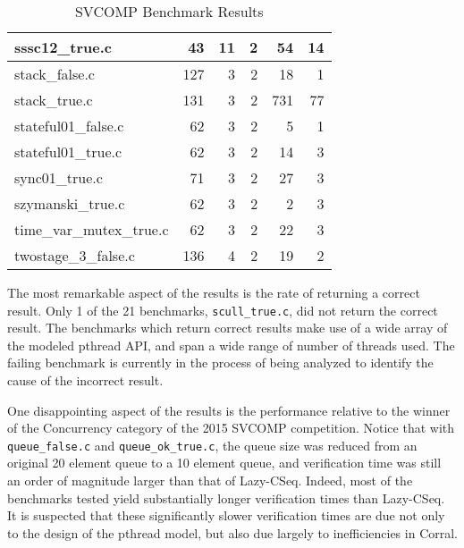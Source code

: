 \begin{table}[ht]
\begin{tabular}{|l|r|r|r|r|r|}
\hline
sssc12\_true.c             & 43  & 11      & 2            & 54            & 14           \\
\hline
stack\_false.c             & 127 & 3       & 2            & 18            & 1            \\
\hline
stack\_true.c              & 131 & 3       & 2            & 731           & 77           \\
\hline
stateful01\_false.c        & 62  & 3       & 2            & 5             & 1            \\
\hline
stateful01\_true.c         & 62  & 3       & 2            & 14            & 3            \\
\hline
sync01\_true.c             & 71  & 3       & 2            & 27            & 3            \\
\hline
szymanski\_true.c          & 62  & 3       & 2            & 2             & 3            \\
\hline
time\_var\_mutex\_true.c   & 62  & 3       & 2            & 22            & 3            \\
\hline
twostage\_3\_false.c       & 136 & 4       & 2            & 19            & 2            \\
\hline
\end{tabular}
\caption{SVCOMP Benchmark Results}\label{table:benchmarkresults}
\end{table}

The most remarkable aspect of the results is the rate of returning a
correct result. Only 1 of the 21 benchmarks,
\lstinline[identifierstyle=\color{black}]|scull_true.c|, did not
return the correct result.  The benchmarks which return correct
results make use of a wide array of the modeled pthread API, and span
a wide range of number of threads used.   The failing benchmark is
currently in the process of being analyzed to identify the cause of
the incorrect result.

One disappointing aspect of the results is the performance relative to
the winner of the Concurrency category of the 2015 SVCOMP
competition.  Notice that with
\lstinline[identifierstyle=\color{black}]|queue_false.c| and
\lstinline[identifierstyle=\color{black}]|queue_ok_true.c|, the queue
size was reduced from an original 20 element queue to a 10 element
queue, and verification time was still an order of magnitude larger
than that of Lazy-CSeq.  Indeed, most of the benchmarks tested yield
substantially longer verification times than Lazy-CSeq.  It is
suspected that these significantly slower verification times are due
not only to the design of the pthread model, but also due largely to
inefficiencies in Corral. 

